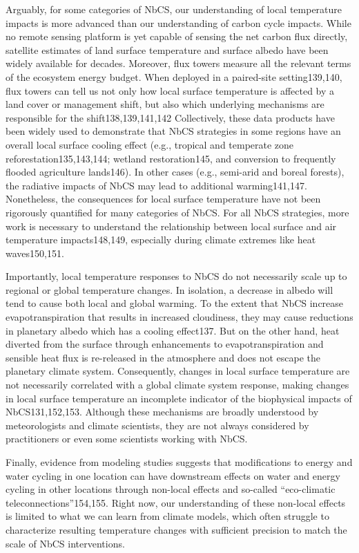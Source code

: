 \documentclass[
  letterpaper,
  DIV=11,
  numbers=noendperiod]{scrreprt}
\begin{document}
Arguably, for some categories of NbCS, our understanding of local
temperature impacts is more advanced than our understanding of carbon
cycle impacts. While no remote sensing platform is yet capable of
sensing the net carbon flux directly, satellite estimates of land
surface temperature and surface albedo have been widely available for
decades. Moreover, flux towers measure all the relevant terms of the
ecosystem energy budget. When deployed in a paired-site setting139,140,
flux towers can tell us not only how local surface temperature is
affected by a land cover or management shift, but also which underlying
mechanisms are responsible for the shift138,139,141,142 Collectively,
these data products have been widely used to demonstrate that NbCS
strategies in some regions have an overall local surface cooling effect
(e.g., tropical and temperate zone reforestation135,143,144; wetland
restoration145, and conversion to frequently flooded agriculture
lands146). In other cases (e.g., semi-arid and boreal forests), the
radiative impacts of NbCS may lead to additional warming141,147.
Nonetheless, the consequences for local surface temperature have not
been rigorously quantified for many categories of NbCS. For all NbCS
strategies, more work is necessary to understand the relationship
between local surface and air temperature impacts148,149, especially
during climate extremes like heat waves150,151.

Importantly, local temperature responses to NbCS do not necessarily
scale up to regional or global temperature changes. In isolation, a
decrease in albedo will tend to cause both local and global warming. To
the extent that NbCS increase evapotranspiration that results in
increased cloudiness, they may cause reductions in planetary albedo
which has a cooling effect137. But on the other hand, heat diverted from
the surface through enhancements to evapotranspiration and sensible heat
flux is re-released in the atmosphere and does not escape the planetary
climate system. Consequently, changes in local surface temperature are
not necessarily correlated with a global climate system response, making
changes in local surface temperature an incomplete indicator of the
biophysical impacts of NbCS131,152,153. Although these mechanisms are
broadly understood by meteorologists and climate scientists, they are
not always considered by practitioners or even some scientists working
with NbCS.

Finally, evidence from modeling studies suggests that modifications to
energy and water cycling in one location can have downstream effects on
water and energy cycling in other locations through non-local effects
and so-called ``eco-climatic teleconnections''154,155. Right now, our
understanding of these non-local effects is limited to what we can learn
from climate models, which often struggle to characterize resulting
temperature changes with sufficient precision to match the scale of NbCS
interventions.
\end{document}
